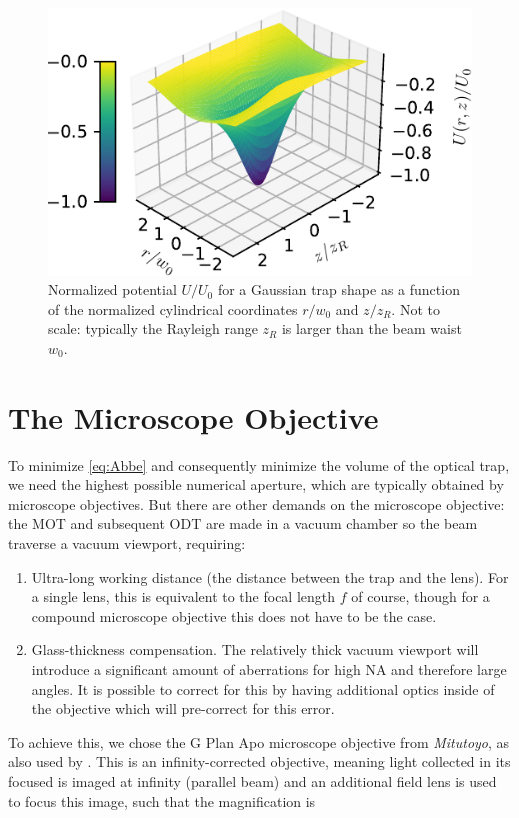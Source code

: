 \begin{figure}
    \centering
    \includegraphics[width=.56\linewidth]{figures/GaussianPotential.pdf}
    \caption{Normalized potential $U/U_0$ for a Gaussian trap shape as a function of the normalized cylindrical coordinates $r/w_0$ and $z/z_R$. Not to scale: typically the Rayleigh range $z_R$ is larger than the beam waist $w_0$.}
    \label{fig:GaussianPotential}
\end{figure}



\section{The Microscope Objective}\label{sec:TweezersPractice}

To minimize \cref{eq:Abbe} and consequently minimize the volume of the optical trap, we need the highest possible numerical aperture, which are typically obtained by microscope objectives. 
But there are other demands on the microscope objective: the \ac{MOT} and subsequent \ac{ODT} are made in a vacuum chamber so the beam traverse a vacuum viewport, requiring:

\begin{enumerate}
    \item Ultra-long working distance (the distance between the trap and the lens). For a single lens, this is equivalent to the focal length $f$ of course, though for a compound microscope objective this does not have to be the case.
    
    \item Glass-thickness compensation. The relatively thick vacuum viewport will introduce a significant amount of aberrations for high NA and therefore large angles. It is possible to correct for this by having additional optics inside of the objective which will pre-correct for this error.
\end{enumerate}
To achieve this, we chose the G Plan Apo microscope objective from \textit{Mitutoyo}, as also used by \cite{Manuel2016,Ebadi2021}. 
This is an infinity-corrected objective, meaning light collected in its focused is imaged at infinity (parallel beam) and an additional field lens is used to focus this image, such that the magnification is 

